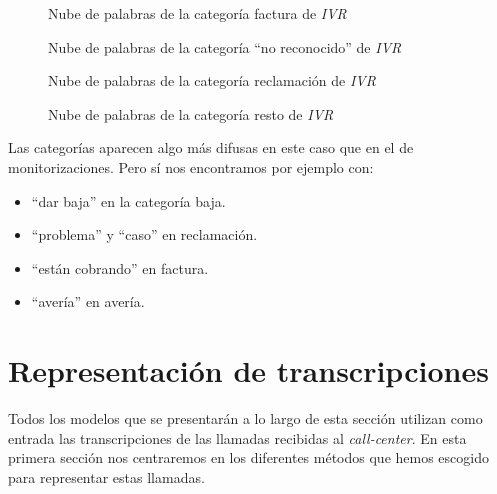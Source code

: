 \begin{figure}[!ht]
	\centering
    \caption{Nube de palabras de la categoría factura de \textit{IVR}}
    \label{fig:cloudivr_factura}
\end{figure} 

\begin{figure}[!ht]
	\centering
    \caption{Nube de palabras de la categoría ``no reconocido'' de \textit{IVR}}
    \label{fig:cloudivr_nrec}
\end{figure} 

\begin{figure}[!ht]
	\centering
    \caption{Nube de palabras de la categoría reclamación de \textit{IVR}}
    \label{fig:cloudivr_recl}
\end{figure} 

\begin{figure}[!ht]
	\centering
    \caption{Nube de palabras de la categoría resto de \textit{IVR}}
    \label{fig:cloudivr_resto}
\end{figure} 

  
  
  
    
    Las categorías aparecen algo más difusas en este caso que en el de
monitorizaciones. Pero sí nos encontramos por ejemplo con:
\begin{itemize}
\item  ``dar baja'' en la categoría baja.

\item ``problema'' y ``caso'' en reclamación.

\item ``están cobrando'' en factura.

\item ``avería'' en avería.

\end{itemize}



\clearpage
\section{Representación de transcripciones}
\label{section:data:repr}

Todos los modelos que se presentarán a lo largo de esta sección utilizan como entrada las transcripciones de las llamadas recibidas al \textit{call-center}. En esta primera sección nos centraremos en los diferentes métodos que hemos escogido para representar estas llamadas.

